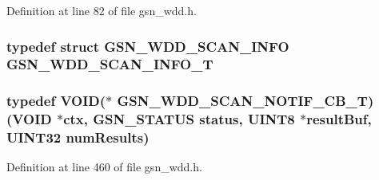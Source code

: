 Definition at line 82 of file gsn\_\-wdd.h.

\hypertarget{a00603_abe2c6b1527f6a2e6bc61ebacfd6f1391}{
\subsubsection[{GSN\_\-WDD\_\-SCAN\_\-INFO\_\-T}]{\setlength{\rightskip}{0pt plus 5cm}typedef struct {\bf GSN\_\-WDD\_\-SCAN\_\-INFO} {\bf GSN\_\-WDD\_\-SCAN\_\-INFO\_\-T}}}
\label{a00603_abe2c6b1527f6a2e6bc61ebacfd6f1391}
\hypertarget{a00603_a4929f46818bd2e51f1d25fecc36d30d6}{
\subsubsection[{GSN\_\-WDD\_\-SCAN\_\-NOTIF\_\-CB\_\-T}]{\setlength{\rightskip}{0pt plus 5cm}typedef VOID($\ast$ {\bf GSN\_\-WDD\_\-SCAN\_\-NOTIF\_\-CB\_\-T})(VOID $\ast$ctx, {\bf GSN\_\-STATUS} status, {\bf UINT8} $\ast$resultBuf, {\bf UINT32} numResults)}}
\label{a00603_a4929f46818bd2e51f1d25fecc36d30d6}


Definition at line 460 of file gsn\_\-wdd.h.

